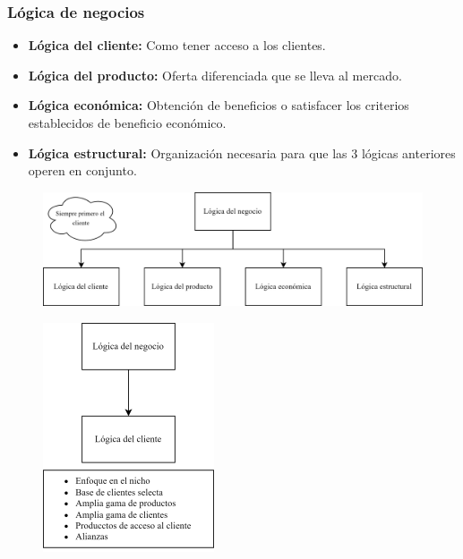\documentclass{templateNote}
\begin{document}
\subsubsection{Lógica de negocios}
\begin{itemize}
    \item \textbf{Lógica del cliente:} Como tener acceso a los clientes.
    \item \textbf{Lógica del producto:} Oferta diferenciada que se lleva al mercado.
    \item \textbf{Lógica económica:} Obtención de beneficios o satisfacer los criterios establecidos de beneficio económico.
    \item \textbf{Lógica estructural:} Organización necesaria para que las 3 lógicas anteriores operen en conjunto.
\end{itemize}

\begin{figure}[H]
    \centering
    \includegraphics[width=1\textwidth]{img/logicanegocio.png}
\end{figure}

\begin{figure}[H]
    \centering
    \includegraphics[width=0.45\textwidth]{img/logicacliente.png}
\end{figure}
\end{document}
